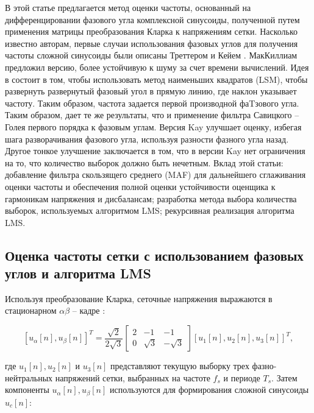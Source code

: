 В этой статье предлагается метод оценки частоты, основанный на дифференцировании фазового угла комплексной синусоиды, полученной путем применения матрицы преобразования Кларка к напряжениям сетки. Насколько известно авторам, первые случаи использования фазовых углов для получения частоты сложной синусоиды были описаны Треттером \cite{tretter1985estimating} и Кейем \cite{kay1989fast}. МакКиллиам \cite{mckilliam2010frequency} предложил версию, более устойчивую к шуму за счет времени вычислений. Идея в \cite{tretter1985estimating} состоит в том, чтобы использовать метод наименьших квадратов (LSM), чтобы развернуть развернутый фазовый угол в прямую линию, где наклон указывает частоту. Таким образом, частота задается первой производной фаTзового угла. Таким образом, \cite{tretter1985estimating} дает те же результаты, что и применение фильтра Савицкого – Голея первого порядка \cite{schafer2011savitzky} к фазовым углам. Версия Kay \cite{kay1989fast} улучшает оценку, избегая шага разворачивания фазового угла, используя разности фазного угла назад. Другое тонкое улучшение заключается в том, что в версии Kay нет ограничения на то, что количество выборок должно быть нечетным. Вклад этой статьи: добавление фильтра скользящего среднего (MAF) для дальнейшего сглаживания оценки частоты и обеспечения полной оценки устойчивости оценщика к гармоникам напряжения и дисбалансам; разработка метода выбора количества выборок, используемых алгоритмом LMS; рекурсивная реализация алгоритма LMS.

\subsection{Оценка частоты сетки с использованием фазовых углов и алгоритма LMS} \label{sec:ch2/sec1_1}

Используя преобразование Кларка, сеточные напряжения выражаются в стационарном $\alpha \beta$ -- кадре :

\begin{equation}
\label{eq:equation113}
[u_{\alpha}[n],u_{\beta}[n]]^T=\dfrac{\sqrt{2}}{2\sqrt{3}} 
\begin{bmatrix}
2 & -1 & -1\\
0 & \sqrt{3} & -\sqrt{3}
\end{bmatrix}
[u_1[n], u_2[n], u_3[n]]^T ,
\end{equation} 

где $u_1[n], u_2[n]$  и  $u_3[n]$ представляют текущую выборку трех фазно-нейтральных напряжений сетки, выбранных на частоте $f_s$  и периоде $T_s$.
Затем компоненты $u_{\alpha}[n] , u_{\beta}[n]$ используются для формирования сложной синусоиды $u_c[n]$:
 
